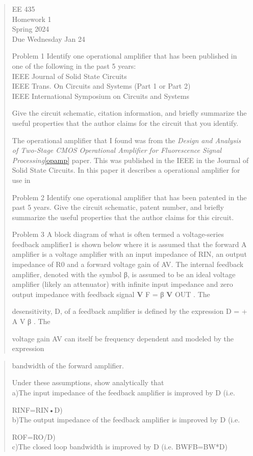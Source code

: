 \documentclass[10pt,a4paper]{article}
\author{}
\date{}
\begin{document}
\begin{quote}
EE 435\\
Homework 1\\
Spring 2024\\
Due Wednesday Jan 24

Problem 1 Identify one operational amplifier that has been published in
one of the following in the past 5 years:\\
IEEE Journal of Solid State Circuits\\
IEEE Trans. On Circuits and Systems (Part 1 or Part 2)\\
IEEE International Symposium on Circuits and Systems

Give the circuit schematic, citation information, and briefly summarize
the useful properties that the author claims for the circuit that you
identify.


The operational amplifier that I found was from the \textit{Design and Analysis of Two-Stage CMOS Operational Amplifier for Fluorescence Signal Processing}\ref{opamp} paper. This was published in the IEEE in the Journal of Solid State Circuits. In this paper it describes a operational amplifier for use in 


Problem 2 Identify one operational amplifier that has been patented in
the past 5 years. Give the circuit schematic, patent number, and briefly
summarize the useful properties that the author claims for this circuit.

Problem 3 A block diagram of what is often termed a voltage-series
feedback amplifier1 is shown below where it is assumed that the forward
A amplifier is a voltage amplifier with an input impedance of RIN, an
output impedance of R0 and a forward voltage gain of AV. The internal
feedback amplifier, denoted with the symbol β, is assumed to be an ideal
voltage amplifier (likely an attenuator) with infinite input impedance
and zero output impedance with feedback signal \textbf{V} F = β
\textbf{V} OUT . The

desensitivity, D, of a feedback amplifier is defined by the expression D
= + A V β . The

voltage gain AV can itself be frequency dependent and modeled by the
expression
\end{quote}



\begin{quote}
bandwidth of the forward amplifier.

Under these assumptions, show analytically that\\
a)The input impedance of the feedback amplifier is improved by D (i.e.

RINF=RIN•D)\\
b)The output impedance of the feedback amplifier is improved by D (i.e.

ROF=RO/D)\\
c)The closed loop bandwidth is improved by D (i.e. BWFB=BW*D)
\end{quote}
\end{document}
